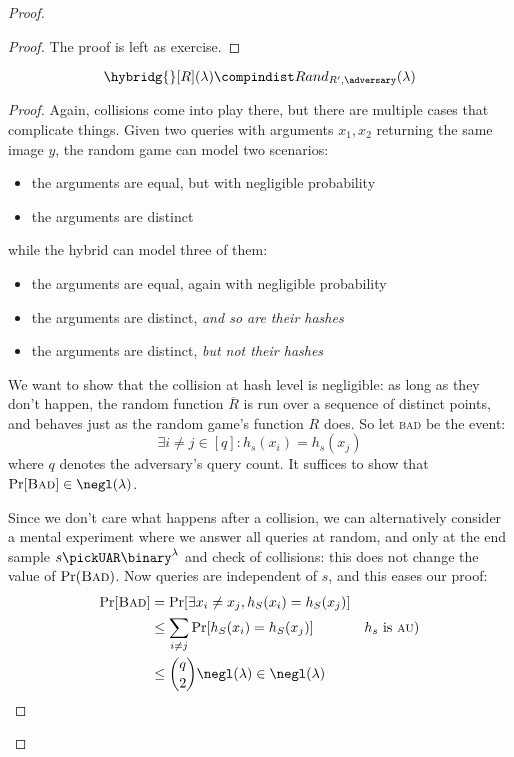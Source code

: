 \begin{proof}
    \begin{proof}
        The proof is left as exercise.
    \end{proof}

    \begin{lemma}
        \[
            \hybridg{}[R](\lambda) \compindist Rand_{R', \adversary}(\lambda)
        \]
    \end{lemma}

    \begin{proof}

        Again, collisions come into play there, but there are multiple cases that complicate things. Given two queries with arguments $x_1, x_2$ returning the same image $y$, the random game can model two scenarios:

        \begin{itemize}
            \item the arguments are equal, but with negligible probability
            \item the arguments are distinct
        \end{itemize}

        while the hybrid can model three of them:

        \begin{itemize}
            \item the arguments are equal, again with negligible probability
            \item the arguments are distinct, \emph{and so are their hashes}
            \item the arguments are distinct, \emph{but not their hashes}
        \end{itemize}
    
        We want to show that the collision at hash level is negligible: as long as they don't happen, the random function $\overline{R}$ is run over a sequence of distinct points, and behaves just as the random game's function $R$ does. So let \textsc{bad} be the event:
        \[
            \exists i \neq j \in [q] : h_s(x_i) = h_s(x_j)
        \]
        where $q$ denotes the adversary's query count. It suffices to show that $\Pr[\textsc{Bad}] \in \negl(\lambda)$.

        Since we don't care what happens after a collision, we can alternatively consider a mental experiment where we answer all queries at random, and only at the end sample $s \pickUAR \binary^\lambda$ and check of collisions: this does not change the value of $\Pr(\textsc{Bad})$. Now queries are independent of $s$, and this eases our proof:
        \begin{align*}
            \Pr[\textsc{Bad}] &= \Pr[\exists x_i \neq x_j, h_S(x_i) = h_S(x_j)] &                               \\
            &\leq \sum_{i \neq j} \Pr[h_S(x_i) = h_S(x_j)]                      & \text{$h_s$ is \textsc{au})}  \\
            &\leq \binom{q}{2} \negl(\lambda) \in \negl(\lambda)                &
        \end{align*}


\end{proof}
\end{proof}
